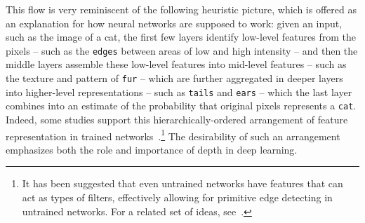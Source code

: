 This flow is very reminiscent of the following heuristic picture, which is offered as an explanation for how neural networks are supposed to work: given an input, such as the image of a cat,
the first few layers identify low-level features from the pixels -- such as the \texttt{edges} between areas of low and high intensity -- and then the middle layers assemble these low-level features into
mid-level features -- such as the texture and pattern of \texttt{fur} -- which are further aggregated in deeper layers into higher-level representations
-- such as \texttt{tails} and \texttt{ears} -- which the last layer combines into an estimate of the probability that original pixels represents a \texttt{cat}.
Indeed, some studies support this hierarchically-ordered arrangement of feature representation
in trained networks~\cite{Rob}.\footnote{It has been suggested that even untrained networks have features that can act as types of filters, effectively allowing for primitive edge detecting in untrained networks. For a related set of ideas, see~\cite{NIPS2007_3182}.} The desirability of such an arrangement emphasizes both the role and importance of depth in deep learning.

